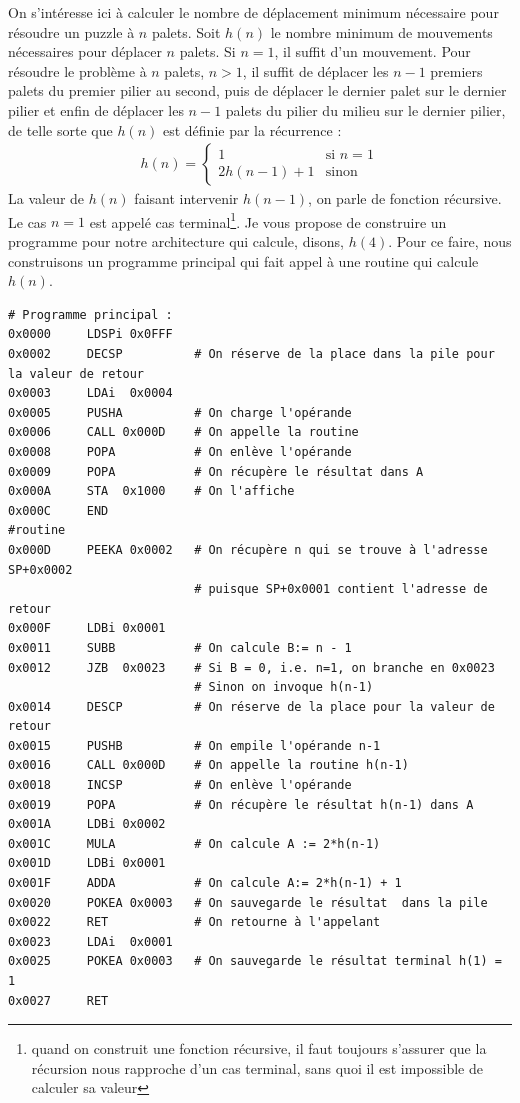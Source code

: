 On s'intéresse ici à calculer le nombre de déplacement minimum nécessaire pour résoudre un puzzle à $n$ palets. Soit $h(n)$ le nombre minimum de mouvements nécessaires pour déplacer $n$ palets. Si $n=1$, il suffit d'un mouvement. Pour résoudre le problème à $n$ palets, $n > 1$, il suffit de déplacer les $n-1$ premiers palets du premier pilier au second, puis de déplacer le dernier palet sur le dernier pilier et enfin de déplacer les $n-1$ palets du pilier du milieu sur le dernier pilier, de telle sorte que $h(n)$ est définie par la récurrence :
\begin{eqnarray*}
h(n) = \begin{cases}
1 & \mbox{si } n=1 \\
2h(n-1) + 1 & \mbox{sinon}
\end{cases}
\end{eqnarray*}
La valeur de $h(n)$ faisant intervenir $h(n-1)$, on parle de fonction récursive. Le cas $n=1$ est appelé cas terminal\footnote{quand on construit une fonction récursive, il faut toujours s'assurer que la récursion nous rapproche d'un cas terminal, sans quoi il est impossible de calculer sa valeur}. Je vous propose de construire un programme pour notre architecture qui calcule, disons, $h(4)$. Pour ce faire, nous construisons un programme principal qui fait appel à une routine qui calcule $h(n)$.
\begin{verbatim}
# Programme principal :
0x0000     LDSPi 0x0FFF
0x0002     DECSP          # On réserve de la place dans la pile pour la valeur de retour
0x0003     LDAi  0x0004
0x0005     PUSHA          # On charge l'opérande
0x0006     CALL 0x000D    # On appelle la routine
0x0008     POPA           # On enlève l'opérande
0x0009     POPA           # On récupère le résultat dans A
0x000A     STA  0x1000    # On l'affiche
0x000C     END
#routine
0x000D     PEEKA 0x0002   # On récupère n qui se trouve à l'adresse SP+0x0002
                          # puisque SP+0x0001 contient l'adresse de retour
0x000F     LDBi 0x0001
0x0011     SUBB           # On calcule B:= n - 1
0x0012     JZB  0x0023    # Si B = 0, i.e. n=1, on branche en 0x0023
                          # Sinon on invoque h(n-1)
0x0014     DESCP          # On réserve de la place pour la valeur de retour
0x0015     PUSHB          # On empile l'opérande n-1
0x0016     CALL 0x000D    # On appelle la routine h(n-1)
0x0018     INCSP          # On enlève l'opérande
0x0019     POPA           # On récupère le résultat h(n-1) dans A
0x001A     LDBi 0x0002    
0x001C     MULA           # On calcule A := 2*h(n-1)
0x001D     LDBi 0x0001   
0x001F     ADDA           # On calcule A:= 2*h(n-1) + 1
0x0020     POKEA 0x0003   # On sauvegarde le résultat  dans la pile
0x0022     RET            # On retourne à l'appelant
0x0023     LDAi  0x0001
0x0025     POKEA 0x0003   # On sauvegarde le résultat terminal h(1) = 1
0x0027     RET
\end{verbatim}
 
